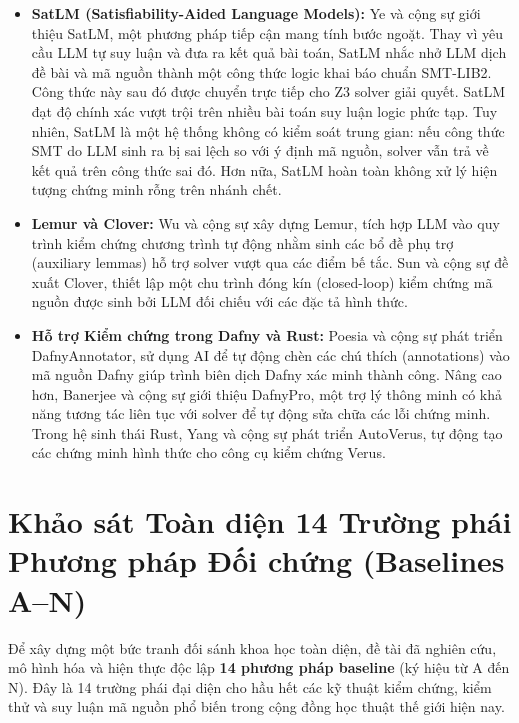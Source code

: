 \begin{itemize}
    \item \textbf{SatLM (Satisfiability-Aided Language Models):} Ye và cộng sự \cite{ye2023satlm} giới thiệu SatLM, một phương pháp tiếp cận mang tính bước ngoặt. Thay vì yêu cầu LLM tự suy luận và đưa ra kết quả bài toán, SatLM nhắc nhở LLM dịch đề bài và mã nguồn thành một công thức logic khai báo chuẩn SMT-LIB2. Công thức này sau đó được chuyển trực tiếp cho Z3 solver giải quyết. SatLM đạt độ chính xác vượt trội trên nhiều bài toán suy luận logic phức tạp. Tuy nhiên, SatLM là một hệ thống không có kiểm soát trung gian: nếu công thức SMT do LLM sinh ra bị sai lệch so với ý định mã nguồn, solver vẫn trả về kết quả trên công thức sai đó. Hơn nữa, SatLM hoàn toàn không xử lý hiện tượng chứng minh rỗng trên nhánh chết.
    \item \textbf{Lemur và Clover:} Wu và cộng sự \cite{wu2024lemur} xây dựng Lemur, tích hợp LLM vào quy trình kiểm chứng chương trình tự động nhằm sinh các bổ đề phụ trợ (auxiliary lemmas) hỗ trợ solver vượt qua các điểm bế tắc. Sun và cộng sự \cite{sun2024clover} đề xuất Clover, thiết lập một chu trình đóng kín (closed-loop) kiểm chứng mã nguồn được sinh bởi LLM đối chiếu với các đặc tả hình thức.
    \item \textbf{Hỗ trợ Kiểm chứng trong Dafny và Rust:} Poesia và cộng sự \cite{poesia2024dafnyannotator} phát triển DafnyAnnotator, sử dụng AI để tự động chèn các chú thích (annotations) vào mã nguồn Dafny giúp trình biên dịch Dafny xác minh thành công. Nâng cao hơn, Banerjee và cộng sự \cite{banerjee2026dafnypro} giới thiệu DafnyPro, một trợ lý thông minh có khả năng tương tác liên tục với solver để tự động sửa chữa các lỗi chứng minh. Trong hệ sinh thái Rust, Yang và cộng sự \cite{yang2025autoverus} phát triển AutoVerus, tự động tạo các chứng minh hình thức cho công cụ kiểm chứng Verus.
\end{itemize}

\section{Khảo sát Toàn diện 14 Trường phái Phương pháp Đối chứng (Baselines A--N)}
\label{sec:baselines_taxonomy}

Để xây dựng một bức tranh đối sánh khoa học toàn diện, đề tài đã nghiên cứu, mô hình hóa và hiện thực độc lập \textbf{14 phương pháp baseline} (ký hiệu từ A đến N). Đây là 14 trường phái đại diện cho hầu hết các kỹ thuật kiểm chứng, kiểm thử và suy luận mã nguồn phổ biến trong cộng đồng học thuật thế giới hiện nay.

